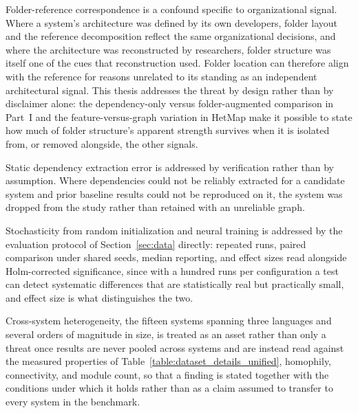 Folder-reference correspondence is a confound specific to organizational signal. Where a system's architecture was defined by its own developers, folder layout and the reference decomposition reflect the same organizational decisions, and where the architecture was reconstructed by researchers, folder structure was itself one of the cues that reconstruction used. Folder location can therefore align with the reference for reasons unrelated to its standing as an independent architectural signal. This thesis addresses the threat by design rather than by disclaimer alone: the dependency-only versus folder-augmented comparison in Part~I and the feature-versus-graph variation in HetMap make it possible to state how much of folder structure's apparent strength survives when it is isolated from, or removed alongside, the other signals.

Static dependency extraction error is addressed by verification rather than by assumption. Where dependencies could not be reliably extracted for a candidate system and prior baseline results could not be reproduced on it, the system was dropped from the study rather than retained with an unreliable graph.

Stochasticity from random initialization and neural training is addressed by the evaluation protocol of Section~\ref{sec:data} directly: repeated runs, paired comparison under shared seeds, median reporting, and effect sizes read alongside Holm-corrected significance, since with a hundred runs per configuration a test can detect systematic differences that are statistically real but practically small, and effect size is what distinguishes the two.

Cross-system heterogeneity, the fifteen systems spanning three languages and several orders of magnitude in size, is treated as an asset rather than only a threat once results are never pooled across systems and are instead read against the measured properties of Table~\ref{table:dataset_details_unified}, homophily, connectivity, and module count, so that a finding is stated together with the conditions under which it holds rather than as a claim assumed to transfer to every system in the benchmark.